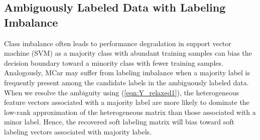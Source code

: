 \documentclass[10pt,journal,compsoc]{IEEEtran}
\begin{document}
\subsection{Ambiguously Labeled Data with Labeling Imbalance}


Class imbalance often leads to performance degradation in support vector machine (SVM) as a majority class with abundant training samples can bias the decision boundary toward a minority class with fewer training samples.
Analogously, MCar may suffer from labeling imbalance when a majority label is frequently present among the candidate labels in the ambiguously labeled data.
When we resolve the ambiguity using (\ref{eqn:Y_relaxed1}), the heterogeneous feature vectors associated with a majority label are more likely to dominate the low-rank approximation of the heterogeneous matrix than those associated with a minor label. Hence, the recovered soft labeling matrix will bias toward soft labeling vectors associated with majority labels.
\end{document}

